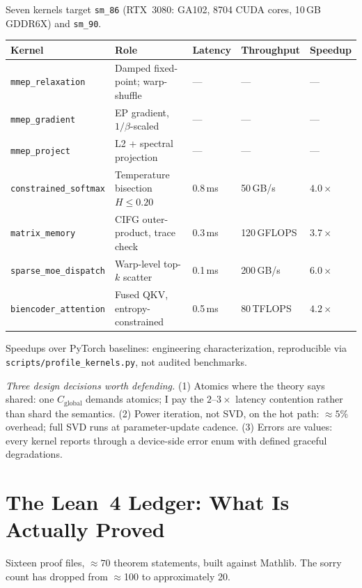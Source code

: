 \documentclass[11pt,letterpaper]{article}
\begin{document}
Seven kernels target \texttt{sm\_86} (RTX~3080: GA102, 8704 CUDA cores, 10\,GB
GDDR6X) and \texttt{sm\_90}.

\begin{center}
\renewcommand{\arraystretch}{1.2}
\begin{tabular}{lllll}
\toprule
Kernel & Role & Latency & Throughput & Speedup \\
\midrule
\texttt{mmep\_relaxation} & Damped fixed-point; warp-shuffle & --- & --- & --- \\
\texttt{mmep\_gradient} & EP gradient, $1/\beta$-scaled & --- & --- & --- \\
\texttt{mmep\_project} & L2 + spectral projection & --- & --- & --- \\
\texttt{constrained\_softmax} & Temperature bisection $H \leq 0.20$ & 0.8\,ms & 50\,GB/s & $4.0\times$ \\
\texttt{matrix\_memory} & CIFG outer-product, trace check & 0.3\,ms & 120\,GFLOPS & $3.7\times$ \\
\texttt{sparse\_moe\_dispatch} & Warp-level top-$k$ scatter & 0.1\,ms & 200\,GB/s & $6.0\times$ \\
\texttt{biencoder\_attention} & Fused QKV, entropy-constrained & 0.5\,ms & 80\,TFLOPS & $4.2\times$ \\
\bottomrule
\end{tabular}
\end{center}

Speedups over PyTorch baselines: engineering characterization, reproducible via
\texttt{scripts/profile\_kernels.py}, not audited benchmarks.

\textit{Three design decisions worth defending.}
(1) Atomics where the theory says shared: one $C_{\text{global}}$ demands
atomics; I pay the $2$--$3\times$ latency contention rather than shard the
semantics.
(2) Power iteration, not SVD, on the hot path: $\approx 5\%$ overhead;
full SVD runs at parameter-update cadence.
(3) Errors are values: every kernel reports through a device-side error enum
with defined graceful degradations.

\section{The Lean~4 Ledger: What Is Actually Proved}
\label{sec:ledger}

Sixteen proof files, $\approx 70$ theorem statements, built against Mathlib.
The sorry count has dropped from $\approx$100 to approximately 20.
\end{document}
